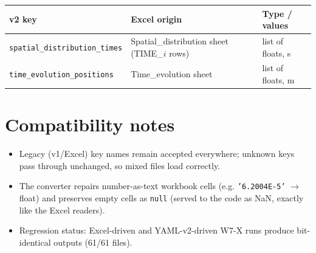 \documentclass[10pt,a4paper]{article}
\newcommand{\code}[1]{\texttt{#1}}
\begin{document}
\begin{longtable}{p{6.2cm}p{4.0cm}p{5.0cm}}
\toprule
\textbf{v2 key} & \textbf{Excel origin} & \textbf{Type / values} \\
\midrule
\endhead
\code{spatial\_distribution\_times} & Spatial\_distribution sheet (TIME\_$i$ rows) & list of floats, s \\
\code{time\_evolution\_positions} & Time\_evolution sheet & list of floats, m \\
\bottomrule
\end{longtable}

\section*{Compatibility notes}
\begin{itemize}
  \item Legacy (v1/Excel) key names remain accepted everywhere; unknown keys
        pass through unchanged, so mixed files load correctly.
  \item The converter repairs number-as-text workbook cells (e.g.
        \code{'6.2004E-5'} $\rightarrow$ float) and preserves empty cells as
        \code{null} (served to the code as NaN, exactly like the Excel
        readers).
  \item Regression status: Excel-driven and YAML-v2-driven W7-X runs produce
        bit-identical outputs (61/61 files).
\end{itemize}
\end{document}
